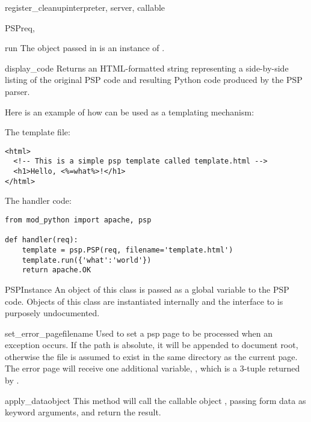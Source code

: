 \begin{funcdesc}{register_cleanup}{interpreter, server, callable}
\begin{classdesc}{PSP}{req, }
\begin{methoddesc}[PSP]{run}{}
    The object passed in  is an instance of
    .

  \end{methoddesc}

  \begin{methoddesc}[PSP]{display_code}{}
    Returns an HTML-formatted string representing a side-by-side
    listing of the original PSP code and resulting Python code
    produced by the PSP parser. 
  \end{methoddesc}

  Here is an example of how  can be used as a templating
  mechanism:
  
  The template file:
  \begin{verbatim}
<html>
  <!-- This is a simple psp template called template.html -->
  <h1>Hello, <%=what%>!</h1>
</html>
  \end{verbatim}
  The handler code:
  \begin{verbatim}
from mod_python import apache, psp

def handler(req):
    template = psp.PSP(req, filename='template.html')
    template.run({'what':'world'})
    return apache.OK
  \end{verbatim}

\end{classdesc}

\begin{classdesc}{PSPInstance}{}
  An object of this class is passed as a global variable  to
  the PSP code. Objects of this class are instantiated internally and
  the interface to  is purposely undocumented.

  \begin{methoddesc}[PSPInstance]{set_error_page}{filename}
    Used to set a psp page to be processed when an exception
    occurs. If the path is absolute, it will be appended to document
    root, otherwise the file is assumed to exist in the same directory
    as the current page. The error page will receive one additional
    variable, , which is a 3-tuple returned by
    .
  \end{methoddesc}

  \begin{methoddesc}[PSPInstance]{apply_data}{object}
    This method will call the callable object , passing form
    data as keyword arguments, and return the result.
  \end{methoddesc}


\end{classdesc}
\end{funcdesc}
